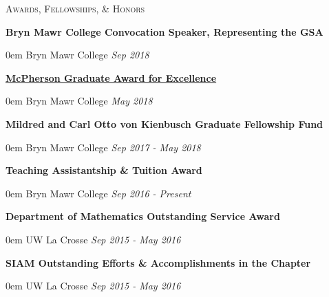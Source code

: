 \documentclass[11pt]{article}
\newenvironment{headitem}[2]{\vskip5pt \hspace{.5em} \textbf{#1} \hfill #2 \begin{addmargin}[0em]{0em}}{\end{addmargin}}
\renewenvironment{section}[1]{\textsc{\large #1}}{\vskip10pt}
\newcommand{\itemdate}[2]{\hspace{.5em} #1 \hfill \textit{#2} \\}
\begin{document}
\begin{section}{Awards, Fellowships, \& Honors}

	\begin{headitem}{Bryn Mawr College Convocation Speaker, Representing the GSA}{}
		\itemdate{Bryn Mawr College}{Sep 2018}
	\end{headitem}
	
	\begin{headitem}{\href{https://www.brynmawr.edu/president/mcpherson-award-excellence}{McPherson Graduate Award for Excellence}}{}
		\itemdate{Bryn Mawr College}{May 2018}
	\end{headitem}
	
	\begin{headitem}{Mildred and Carl Otto von Kienbusch Graduate Fellowship Fund}{}
		\itemdate{Bryn Mawr College}{Sep 2017 - May 2018}
	\end{headitem}
	
	\begin{headitem}{Teaching Assistantship \& Tuition Award}{}
		\itemdate{Bryn Mawr College}{Sep 2016 - Present}
	\end{headitem}
	
	\begin{headitem}{Department of Mathematics Outstanding Service Award}{}
		\itemdate{UW La Crosse}{Sep 2015 - May 2016}
	\end{headitem}
	
	\begin{headitem}{SIAM Outstanding Efforts \& Accomplishments in the Chapter}{}
		\itemdate{UW La Crosse}{Sep 2015 - May 2016}
	\end{headitem}
	
\end{section}



%	
%	

		
\end{document}
